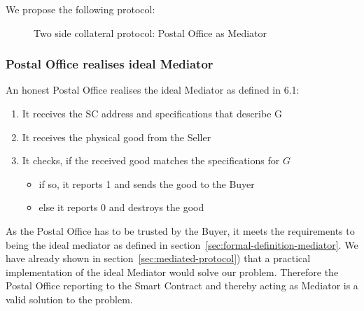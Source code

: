 \documentclass{cacthesis}
\begin{document}
We propose the following protocol:
\begin{figure}[htb!]
    \centering
    \caption{Two side collateral protocol: Postal Office as Mediator}
    \label{pro:two-side-collateral-postal}
\end{figure}

\subsubsection{Postal Office realises ideal Mediator}
An honest Postal Office realises the ideal Mediator as defined in 6.1:
\begin{enumerate}
    \item It receives the SC address and specifications that describe G
    \item It receives the physical good from the Seller
    \item It checks, if the received good matches the specifications for $G$
        \begin{itemize}
            \item if so, it reports 1 and sends the good to the Buyer
            \item else it reports 0 and destroys the good
        \end{itemize}
\end{enumerate}
As the Postal Office has to be trusted by the Buyer, it meets the requirements to being the ideal mediator as defined in section~\ref{sec:formal-definition-mediator}. We have already shown in section~\ref{sec:mediated-protocol}) that a practical implementation of the ideal Mediator would solve our problem. Therefore the Postal Office reporting to the Smart Contract and thereby acting as Mediator is a valid solution to the problem.\newline
\end{document}
